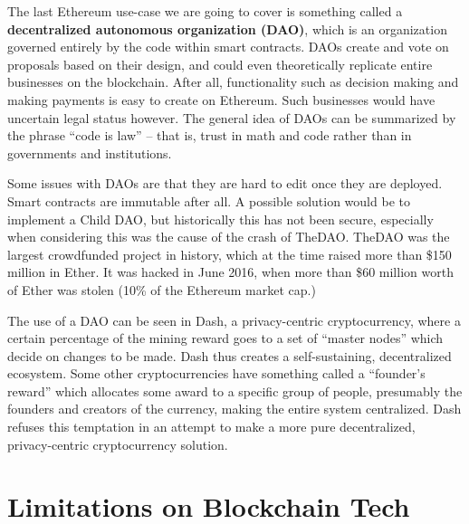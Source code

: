 \documentclass[full.tex]{subfiles}
\begin{document}
    The last Ethereum use-case we are going to cover is something called a \textbf{decentralized autonomous organization (DAO)}, which is an organization governed entirely by the code within smart contracts. DAOs create and vote on proposals based on their design, and could even theoretically replicate entire businesses on the blockchain. After all, functionality such as decision making and making payments is easy to create on Ethereum. Such businesses would have uncertain legal status however. The general idea of DAOs can be summarized by the phrase ``code is law'' -- that is, trust in math and code rather than in governments and institutions.
    
    Some issues with DAOs are that they are hard to edit once they are deployed. Smart contracts are immutable after all. A possible solution would be to implement a Child DAO, but historically this has not been secure, especially when considering this was the cause of the crash of TheDAO. TheDAO was the largest crowdfunded project in history, which at the time raised more than \$150 million in Ether. It was hacked in June 2016, when more than \$60 million worth of Ether was stolen (10\% of the Ethereum market cap.) 
    
    The use of a DAO can be seen in Dash, a privacy-centric cryptocurrency, where a certain percentage of the mining reward goes to a set of ``master nodes'' which decide on changes to be made. Dash thus creates a self-sustaining, decentralized ecosystem. Some other cryptocurrencies have something called a ``founder's reward'' which allocates some award to a specific group of people, presumably the founders and creators of the currency, making the entire system centralized. Dash refuses this temptation in an attempt to make a more pure decentralized, privacy-centric cryptocurrency solution.
    
    \section*{Limitations on Blockchain Tech}
    
\end{document}
